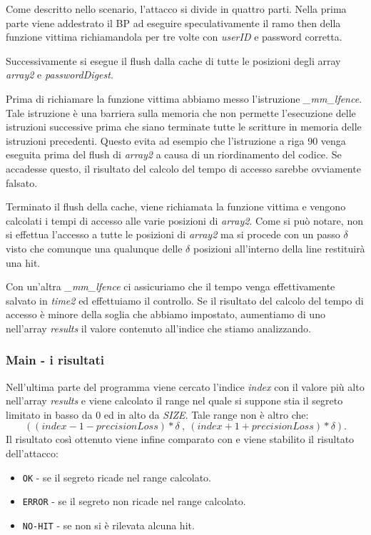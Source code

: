 				Come descritto nello scenario, l'attacco si divide in quattro parti. Nella prima parte viene addestrato il \ac{BP} ad eseguire speculativamente il ramo then della funzione vittima richiamandola per tre volte con \emph{userID} e password corretta.
				
				Successivamente si esegue il flush dalla cache di tutte le posizioni degli array \emph{array2} e \emph{passwordDigest}.
				
				Prima di richiamare la funzione vittima abbiamo messo l'istruzione \emph{\_mm\_lfence}. Tale istruzione è una barriera sulla memoria che non permette l'esecuzione delle istruzioni successive prima che siano terminate tutte le scritture in memoria delle istruzioni precedenti. Questo evita ad esempio che l'istruzione a riga 90 venga eseguita prima del flush di \emph{array2} a causa di un riordinamento del codice. Se accadesse questo, il risultato del calcolo del tempo di accesso sarebbe ovviamente falsato.
				
				Terminato il flush della cache, viene richiamata la funzione vittima e vengono calcolati i tempi di accesso alle varie posizioni di \emph{array2}. Come si può notare, non si effettua l'accesso a tutte le posizioni di \emph{array2} ma si procede con un passo $\delta$ visto che comunque una qualunque delle $\delta$ posizioni all'interno della line restituirà una hit.
				
				Con un'altra \emph{\_mm\_lfence} ci assicuriamo che il tempo venga effettivamente salvato in \emph{time2} ed effettuiamo il controllo. Se il risultato del calcolo del tempo di accesso è minore della soglia che abbiamo impostato, aumentiamo di uno nell'array \emph{results} il valore  contenuto all'indice che stiamo analizzando.
				
				\subsubsection{Main - i risultati}
				
				Nell'ultima parte del programma viene cercato l'indice \emph{index} con il valore più alto nell'array \emph{results} e viene calcolato il range nel quale si suppone stia il segreto limitato in basso da $0$ ed in alto da \emph{SIZE}. Tale range non è altro che: $$((index - 1 - precisionLoss) * \delta\ ,\ (index + 1 + precisionLoss) * \delta).$$ Il risultato così ottenuto viene infine comparato con  e viene stabilito il risultato dell'attacco:
				
				\begin{itemize}
					\item \texttt{OK} - se il segreto ricade nel range calcolato.
					\item \texttt{ERROR} - se il segreto non ricade nel range calcolato.
					\item \texttt{NO-HIT} - se non si è rilevata alcuna hit.
				\end{itemize}